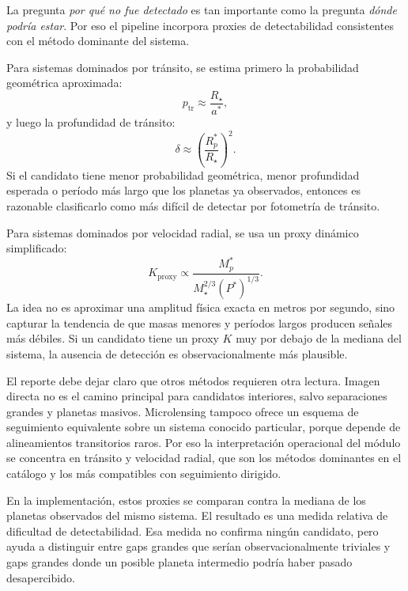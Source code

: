 La pregunta \emph{por qu\'e no fue detectado} es tan importante como la pregunta \emph{d\'onde podr\'ia estar}. Por eso el pipeline incorpora proxies de detectabilidad consistentes con el m\'etodo dominante del sistema.

Para sistemas dominados por tr\'ansito, se estima primero la probabilidad geom\'etrica aproximada:
\[
p_{\mathrm{tr}} \approx \frac{R_\star}{a^\ast},
\]
y luego la profundidad de tr\'ansito:
\[
\delta \approx \left(\frac{R_p^\ast}{R_\star}\right)^2.
\]
Si el candidato tiene menor probabilidad geom\'etrica, menor profundidad esperada o per\'iodo m\'as largo que los planetas ya observados, entonces es razonable clasificarlo como m\'as dif\'icil de detectar por fotometr\'ia de tr\'ansito.

Para sistemas dominados por velocidad radial, se usa un proxy din\'amico simplificado:
\[
K_{\mathrm{proxy}}
\propto
\frac{M_p^\ast}{M_\star^{2/3}(P^\ast)^{1/3}}.
\]
La idea no es aproximar una amplitud f\'isica exacta en metros por segundo, sino capturar la tendencia de que masas menores y per\'iodos largos producen se\~nales m\'as d\'ebiles. Si un candidato tiene un proxy $K$ muy por debajo de la mediana del sistema, la ausencia de detecci\'on es observacionalmente m\'as plausible.

El reporte debe dejar claro que otros m\'etodos requieren otra lectura. Imagen directa no es el camino principal para candidatos interiores, salvo separaciones grandes y planetas masivos. Microlensing tampoco ofrece un esquema de seguimiento equivalente sobre un sistema conocido particular, porque depende de alineamientos transitorios raros. Por eso la interpretaci\'on operacional del m\'odulo se concentra en tr\'ansito y velocidad radial, que son los m\'etodos dominantes en el cat\'alogo y los m\'as compatibles con seguimiento dirigido.

En la implementaci\'on, estos proxies se comparan contra la mediana de los planetas observados del mismo sistema. El resultado es una medida relativa de dificultad de detectabilidad. Esa medida no confirma ning\'un candidato, pero ayuda a distinguir entre gaps grandes que ser\'ian observacionalmente triviales y gaps grandes donde un posible planeta intermedio podr\'ia haber pasado desapercibido.
